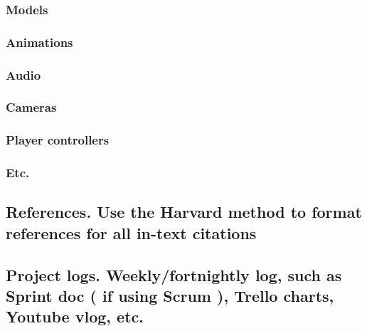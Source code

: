 \documentclass[article, 11pt]{article}
\begin{document}
\subsubsection{Models}
\label{sec:org634a8f3}
\subsubsection{Animations}
\label{sec:org5b017ba}
\subsubsection{Audio}
\label{sec:org1f7bed0}
\subsubsection{Cameras}
\label{sec:orgc7fbb61}
\subsubsection{Player controllers}
\label{sec:org0cbd4ce}
\subsubsection{Etc.}
\label{sec:org047b000}
\subsection{References. Use the Harvard method to format references for all in-text citations}
\label{sec:orga146072}
\subsection{Project logs. Weekly/fortnightly log, such as Sprint doc ( if using Scrum ), Trello charts, Youtube vlog, etc.}
\label{sec:org5a980dd}
\end{document}
